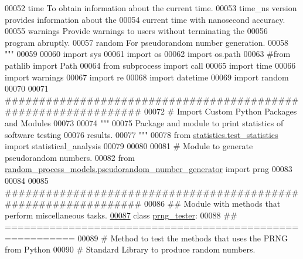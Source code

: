 \begin{DoxyCode}
00052 \textcolor{stringliteral}{    time        To obtain information about the current time.}
00053 \textcolor{stringliteral}{                time\_ns version provides information about the}
00054 \textcolor{stringliteral}{                    current time with nanosecond accuracy.}
00055 \textcolor{stringliteral}{    warnings    Provide warnings to users without terminating the}
00056 \textcolor{stringliteral}{                    program abruptly.}
00057 \textcolor{stringliteral}{    random      For pseudorandom number generation.}
00058 \textcolor{stringliteral}{"""}
00059 
00060 \textcolor{keyword}{import} sys
00061 \textcolor{keyword}{import} os
00062 \textcolor{keyword}{import} os.path
00063 \textcolor{comment}{#from pathlib import Path}
00064 \textcolor{keyword}{from} subprocess \textcolor{keyword}{import} call
00065 \textcolor{keyword}{import} time
00066 \textcolor{keyword}{import} warnings
00067 \textcolor{keyword}{import} re
00068 \textcolor{keyword}{import} datetime
00069 \textcolor{keyword}{import} random
00070 
00071 \textcolor{comment}{###############################################################}
00072 \textcolor{comment}{#   Import Custom Python Packages and Modules}
00073 
00074 \textcolor{stringliteral}{"""}
00075 \textcolor{stringliteral}{    Package and module to print statistics of software testing}
00076 \textcolor{stringliteral}{        results.}
00077 \textcolor{stringliteral}{"""}
00078 \textcolor{keyword}{from} \hyperlink{namespacestatistics_1_1test__statistics}{statistics.test\_statistics} \textcolor{keyword}{import} statistical\_analysis
00079 
00080 
00081 \textcolor{comment}{# Module to generate pseudorandom numbers.}
00082 \textcolor{keyword}{from} \hyperlink{namespacerandom__process__models_1_1pseudorandom__number__generator}{random\_process\_models.pseudorandom\_number\_generator}
       \textcolor{keyword}{import} prng
00083 
00084 
00085 \textcolor{comment}{###############################################################}
00086 \textcolor{comment}{##  Module with methods that perform miscellaneous tasks.}
\hypertarget{pseudorandom__number__generator__tester_8py_source_l00087}{}\hyperlink{classrandom__process__models_1_1pseudorandom__number__generator__tester_1_1prng__tester}{00087} \textcolor{keyword}{class }\hyperlink{classrandom__process__models_1_1pseudorandom__number__generator__tester_1_1prng__tester}{prng\_tester}:
00088     \textcolor{comment}{## =========================================================}
00089     \textcolor{comment}{#   Method to test the methods that uses the PRNG from Python}
00090     \textcolor{comment}{#       Standard Library to produce random numbers.}

\end{DoxyCode}
